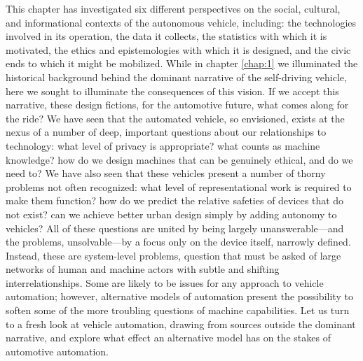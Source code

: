 This chapter has investigated six different perspectives on the
social, cultural, and informational contexts of the autonomous
vehicle, including:  the technologies involved in its operation, the
data it collects, the statistics with which it is motivated, the
ethics and epistemologies with which it is designed, and the civic
ends to which it might be mobilized. While in chapter \ref{chap:1} we
illuminated the historical background behind the dominant narrative of
the self-driving vehicle, here we sought to illuminate the
consequences of this vision. If we accept this narrative, these design
fictions, for the automotive future, what comes along for the ride? We
have seen that the automated vehicle, so envisioned, exists at the
nexus of a number of deep, important questions about our relationships
to technology: what level of privacy is appropriate? what counts as machine
knowledge? how do we design machines that can be genuinely ethical,
and do we need to? We have also seen that these vehicles present a
number of thorny problems not often recognized: what level of
representational work is required to make them function? how do we
predict the relative safeties of devices that do not exist? can we
achieve better urban design simply by adding autonomy to vehicles?
All of these questions are united by being largely unanswerable---and
the problems, unsolvable---by a focus only on the device itself,
narrowly defined. Instead, these are system-level problems, question
that must be asked of large networks of human and machine actors with
subtle and shifting interrelationships. Some are likely to be issues
for any approach to vehicle automation; however, alternative models of
automation present the possibility to soften some of the more
troubling questions of machine capabilities. Let us turn to a fresh look at
vehicle automation, drawing from sources outside the dominant
narrative, and explore what effect an alternative model has on the
stakes of automotive automation.

